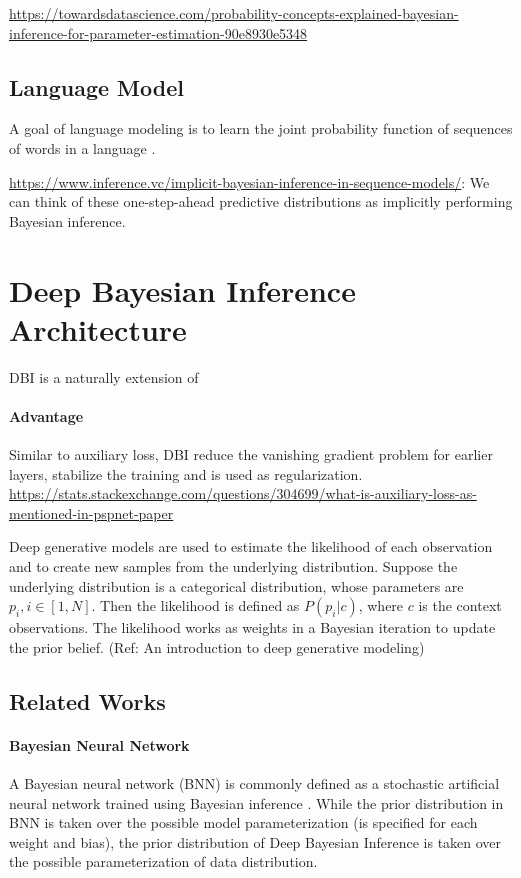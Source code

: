 \documentclass{article}
\begin{document}
\url{https://towardsdatascience.com/probability-concepts-explained-bayesian-inference-for-parameter-estimation-90e8930e5348}


\subsection{Language Model}

A goal of language modeling is to learn the joint probability function of sequences of words in a language \citep{bengio2000neural}.


\url{https://www.inference.vc/implicit-bayesian-inference-in-sequence-models/}:
We can think of these one-step-ahead predictive distributions as implicitly performing Bayesian inference.


\section{Deep Bayesian Inference Architecture}

DBI is a naturally extension of 

\paragraph{Advantage} 
Similar to auxiliary loss, DBI reduce the vanishing gradient problem for earlier layers, stabilize the training and is used as regularization.
\url{https://stats.stackexchange.com/questions/304699/what-is-auxiliary-loss-as-mentioned-in-pspnet-paper}

Deep generative models are used to estimate the likelihood of each observation and to create new samples from the underlying distribution.
Suppose the underlying distribution is a categorical distribution, whose parameters are $p_i, i \in [1, N]$.
Then the likelihood is defined as $P(p_i | c)$, where $c$ is the context observations.
The likelihood works as weights in a Bayesian iteration to update the prior belief.
(Ref: An introduction to deep generative modeling)



\subsection{Related Works}

\paragraph{Bayesian Neural Network}
A Bayesian neural network (BNN) is commonly defined as a stochastic artificial neural network trained using Bayesian inference \citep{jospin2022hands}.
While the prior distribution in BNN is taken over the possible model parameterization (is specified for each weight and bias),
the prior distribution of Deep Bayesian Inference is taken over the possible parameterization of data distribution.
\end{document}
